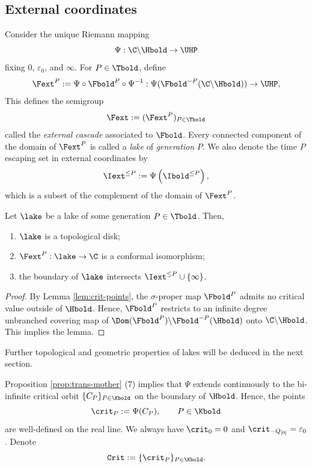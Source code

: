 \documentclass{amsart}
\begin{document}
\subsection{External coordinates}
\label{ss:trans-external-coordinates}

Consider the unique Riemann mapping
\[
    \Psi: \C \backslash \Hbold \to \UHP
\]
fixing $0$, $\varepsilon_0$, and $\infty$. For $P \in \Tbold$, define 
\[
    \Fext^{P} := \Psi \circ \Fbold^{P} \circ \Psi^{-1} : \Psi( \Fbold^{-P}(\C \backslash \Hbold) ) \to \UHP,
\]
This defines the semigroup 
\[
\Fext := (\Fext^P)_{P \in \Tbold}
\]
called the \emph{external cascade} associated to $\Fbold$.
Every connected component of the domain of $\Fext^P$ is called a \emph{lake} of \emph{generation} $P$.
We also denote the time $P$ escaping set in external coordinates by
\[
    \Iext^{\leq P} := \Psi \left( \Ibold^{\leq P} \right),
\]
which is a subset of the complement of the domain of $\Fext^P$.

\begin{lemma}
    Let $\lake$ be a lake of some generation $P \in \Tbold$.
    Then,
    \begin{enumerate}
        \item $\lake$ is a topological disk;
        \item $\Fext^P : \lake \to \C$ is a conformal isomorphism;
        \item the boundary of $\lake$ intersects $\Iext^{\leq P} \cup \{\infty\}$. 
    \end{enumerate}
\end{lemma}

\begin{proof}
    By Lemma \ref{lem:crit-points}, the $\sigma$-proper map $\Fbold^P$ admits no critical value outside of $\Hbold$. 
    Hence, $\Fbold^P$ restricts to an infinite degree unbranched covering map of $\Dom(\Fbold^P) \backslash \Fbold^{-P}(\Hbold)$ onto $\C \backslash \Hbold$.
    This implies the lemma.
\end{proof}

Further topological and geometric properties of lakes will be deduced in the next section.

Proposition \ref{prop:trans-mother} (7) implies that $\Psi$ extends continuously to the bi-infinite critical orbit $\{C_P\}_{P\in \Kbold}$ on the boundary of $\Hbold$. 
Hence, the points
\[
    \crit_P := \Psi(C_P),\qquad P \in \Kbold
\]
are well-defined on the real line. We always have $\crit_0 = 0$ and $\crit_{-Q_{[0]}} = \varepsilon_0$. 
Denote
\[
    \mathtt{Crit} := \{ \crit_{P} \}_{P \in \Kbold}.
\]
\end{document}
